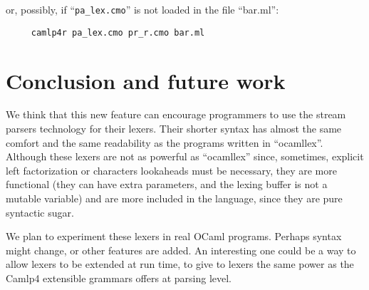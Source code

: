 \documentclass[11pt]{article}
\begin{document}
or, possibly, if ``\verb/pa_lex.cmo/'' is not loaded in the file ``bar.ml'':

\begin{verbatim}
     camlp4r pa_lex.cmo pr_r.cmo bar.ml
\end{verbatim}

\section{Conclusion and future work}
\label{conclusion}

We think that this new feature can encourage programmers to use the
stream parsers technology for their lexers. Their shorter syntax has
almost the same comfort and the same readability as the programs
written in ``ocamllex''. Although these lexers are not as powerful as
``ocamllex'' since, sometimes, explicit left factorization or
characters lookaheads must be necessary, they are more functional
(they can have extra parameters, and the lexing buffer is not a
mutable variable) and are more included in the language, since they
are pure syntactic sugar.

We plan to experiment these lexers in real OCaml programs. Perhaps
syntax might change, or other features are added. An interesting one
could be a way to allow lexers to be extended at run time, to give to
lexers the same power as the Camlp4 extensible grammars offers at
parsing level.

\nocite{Goscinny}



\end{document}
